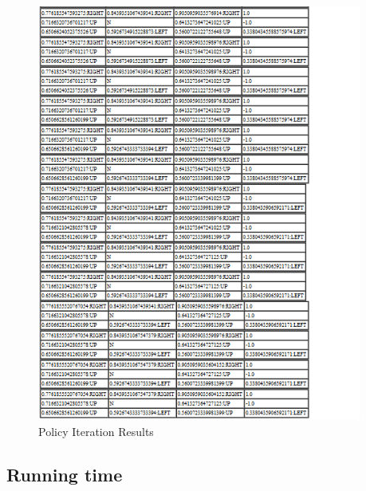 \begin{figure}[h!]
    \label{fig:ValueIterationResults3}
    \begin{center}
        \includegraphics[width=0.95\textwidth]{Figures/Planning_Figure_4.png}
        \caption{Policy Iteration Results}
    \end{center}
\end{figure}


\subsection{Running time}

